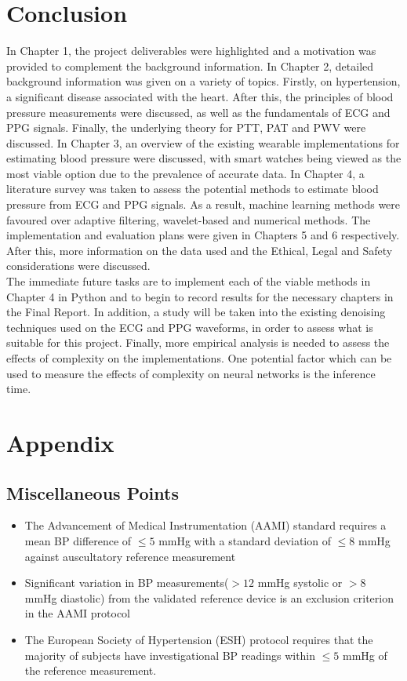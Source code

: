 \documentclass[11pt, a4paper]{article}
\begin{document}
\section{Conclusion}
In Chapter 1, the project deliverables were highlighted and a motivation was provided to complement the background information. In Chapter 2, detailed background information was given on a variety of topics. Firstly, on hypertension, a significant disease associated with the heart. After this, the principles of blood pressure measurements were discussed, as well as the fundamentals of ECG and PPG signals. Finally, the underlying theory for PTT, PAT and PWV were discussed. In Chapter 3, an overview of the existing wearable implementations for estimating blood pressure were discussed, with smart watches being viewed as the most viable option due to the prevalence of accurate data. In Chapter 4, a literature survey was taken to assess the potential methods to estimate blood pressure from ECG and PPG signals. As a result, machine learning methods were favoured over adaptive filtering, wavelet-based and numerical methods. The implementation and evaluation plans were given in Chapters 5 and 6 respectively. After this, more information on the data used and the Ethical, Legal and Safety considerations were discussed. \\ \newline \noindent The immediate future tasks are to implement each of the viable methods in Chapter 4 in Python and to begin to record results for the necessary chapters in the Final Report. In addition, a study will be taken into the existing denoising techniques used on the ECG and PPG waveforms, in order to assess what is suitable for this project. Finally, more empirical analysis is needed to assess the effects of complexity on the implementations. One potential factor which can be used to measure the effects of complexity on neural networks is the inference time.
\newpage

\section{Appendix}
\subsection{Miscellaneous Points}
\begin{itemize}
    \item The Advancement of Medical Instrumentation (AAMI) standard requires a mean BP difference of $\le 5$ mmHg with a standard deviation of $\le 8$ mmHg against auscultatory reference measurement
    \item Significant variation in BP measurements($\gt 12$ mmHg systolic or $\gt 8$ mmHg diastolic) from the validated reference device is an exclusion criterion in the AAMI protocol \cite{Bard2019}
    \item The European Society of Hypertension (ESH) protocol requires that the majority of subjects have investigational BP readings within $\le 5$ mmHg of the reference measurement.
\end{itemize}
\end{document}
